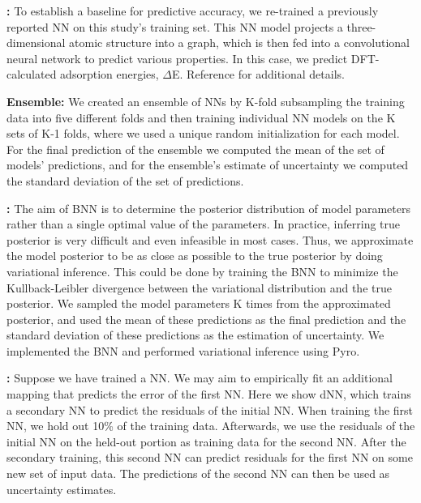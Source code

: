 \documentclass[]{achemso}
\begin{document}
\textbf{:}
To establish a baseline for predictive accuracy, we re-trained a previously reported \gls{NN}\cite{Xie2018, Back2019} on this study's training set.
This \gls{NN} model projects a three-dimensional atomic structure into a graph, which is then fed into a convolutional neural network to predict various properties.
In this case, we predict \gls{DFT}-calculated adsorption energies, $\Delta$E.
Reference \citet{Back2019} for additional details.

\textbf{ Ensemble:}
We created an ensemble of \gls{NN}s by K-fold subsampling the training data
into five different folds and then training individual \gls{NN} models on the K
sets of K-1 folds, where we used a unique random initialization for each model.
For the final prediction of the ensemble we computed the mean of the set of
models' predictions, and for the ensemble's estimate of uncertainty we computed
the standard deviation of the set of predictions.

\textbf{:}
The aim of \gls{BNN} is to determine the posterior distribution of model parameters rather than a single optimal value of the parameters.
In practice, inferring true posterior is very difficult and even infeasible in most cases.
Thus, we approximate the model posterior to be as close as possible to the true posterior by doing variational inference.
This could be done by training the \gls{BNN} to minimize the Kullback-Leibler divergence between the variational distribution and the true posterior.
We sampled the model parameters K times from the approximated posterior, and used the mean of these predictions as the final prediction and the standard deviation of these predictions as the estimation of uncertainty.
We implemented the \gls{BNN} and performed variational inference using Pyro.\cite{Bingham2018}

\textbf{:}
Suppose we have trained a \gls{NN}.
We may aim to empirically fit an additional mapping that predicts the error of the first \gls{NN}.
Here we show \gls{dNN}, which trains a secondary \gls{NN} to predict the residuals of the initial \gls{NN}.
When training the first \gls{NN}, we hold out 10\% of the training data.
Afterwards, we use the residuals of the initial \gls{NN} on the held-out portion as training data for the second \gls{NN}.
After the secondary training, this second \gls{NN} can predict residuals for the first \gls{NN} on some new set of input data.
The predictions of the second \gls{NN} can then be used as uncertainty estimates.
\end{document}
